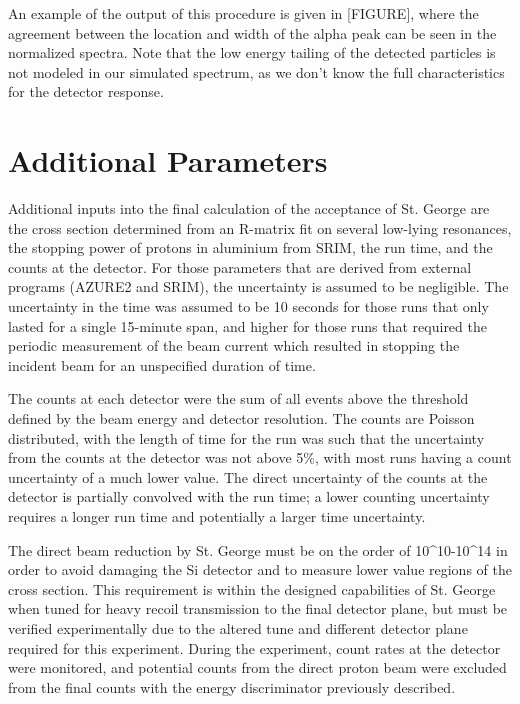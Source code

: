 An example of the output of this procedure is given in {[}FIGURE{]},
where the agreement between the location and width of the alpha peak can
be seen in the normalized spectra. Note that the low energy tailing of
the detected particles is not modeled in our simulated spectrum, as we
don't know the full characteristics for the detector response.

\section{Additional Parameters}\label{additional-parameters}

Additional inputs into the final calculation of the acceptance of St.
George are the cross section determined from an R-matrix fit on several
low-lying resonances, the stopping power of protons in aluminium from
SRIM, the run time, and the counts at the detector. For those parameters
that are derived from external programs (AZURE2 and SRIM), the
uncertainty is assumed to be negligible. The uncertainty in the time was
assumed to be 10 seconds for those runs that only lasted for a single
15-minute span, and higher for those runs that required the periodic
measurement of the beam current which resulted in stopping the incident
beam for an unspecified duration of time.

The counts at each detector were the sum of all events above the
threshold defined by the beam energy and detector resolution. The counts
are Poisson distributed, with the length of time for the run was such
that the uncertainty from the counts at the detector was not above 5\%,
with most runs having a count uncertainty of a much lower value. The
direct uncertainty of the counts at the detector is partially convolved
with the run time; a lower counting uncertainty requires a longer run
time and potentially a larger time uncertainty.

The direct beam reduction by St. George must be on the order of
10\^{}10-10\^{}14 in order to avoid damaging the Si detector and to
measure lower value regions of the cross section. This requirement is
within the designed capabilities of St. George when tuned for heavy
recoil transmission to the final detector plane, but must be verified
experimentally due to the altered tune and different detector plane
required for this experiment. During the experiment, count rates at the
detector were monitored, and potential counts from the direct proton
beam were excluded from the final counts with the energy discriminator
previously described.

